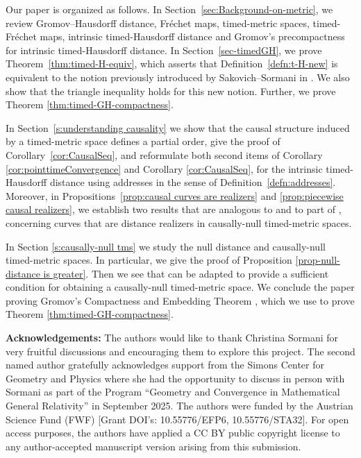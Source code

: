 \documentclass[a4paper,12pt,reqno]{amsart}
\theoremstyle{plain}
\begin{document}
\bigskip 
Our paper is organized as follows.
In Section~\ref{sec:Background-on-metric}, we review Gromov--Hausdorff distance, Fr\'echet maps, timed-metric spaces, timed-Fr\'echet maps, intrinsic timed-Hausdorff distance and Gromov's precompactness for intrinsic timed-Hausdorff distance. In Section~\ref{sec-timedGH}, we prove Theorem~\ref{thm:timed-H-equiv}, which asserts that 
Definition~\ref{defn:t-H-new} is equivalent to the notion previously introduced by Sakovich--Sormani in \cite[Definition~4.22]{SakSor-Notions}. We also show that the triangle inequality holds for this new notion. Further, we prove Theorem \ref{thm:timed-GH-compactness}.


In Section~\ref{s:understanding causality} we show that the causal structure induced by a timed-metric space defines a partial order, 
give the proof of Corollary~\ref{cor:CausalSeq}, and reformulate  both second items of Corollary \ref{cor:pointtimeConvergence} and Corollary \ref{cor:CausalSeq}, for the intrinsic timed-Hausdorff distance using addresses in the sense of Definition~\ref{defn:addresses}. Moreover,
in Propositions~\ref{prop:causal curves are realizers} and \ref{prop:piecewise causal realizers},
we establish two results that are analogous to \cite[Corollary~3.19]{SV-Null} and to part of \cite[Lemma~3.20]{SV-Null}, concerning curves that are distance realizers in causally-null timed-metric spaces.



In Section \ref{s:causally-null tms} we study the null distance and causally-null timed-metric spaces. In particular, we give the proof of Proposition \ref{prop-null-distance is greater}. 
Then we see that
 \cite[Lemma~3.5]{Kunzinger-Steinbauer-22} 
can be adapted to provide a sufficient condition for obtaining a causally-null timed-metric space. 
We conclude the paper proving 
Gromov's Compactness and Embedding Theorem \cite{Gromov-poly}, which we use to prove Theorem \ref{thm:timed-GH-compactness}.




\bigskip

{\bf Acknowledgements:}  The authors would like to thank Christina Sormani for very fruitful discussions and encouraging them to explore this project. The second named author gratefully acknowledges support from the Simons Center for Geometry and Physics where she had the opportunity to discuss in person with Sormani as part of the Program ``Geometry and Convergence in Mathematical General Relativity'' in September 2025. 
The authors were funded by the Austrian Science Fund
(FWF) [Grant DOI's: 10.55776/EFP6, 10.55776/STA32]. For open access purposes, the authors have applied a CC BY public copyright license to any author-accepted manuscript version arising from this submission.
\end{document}
